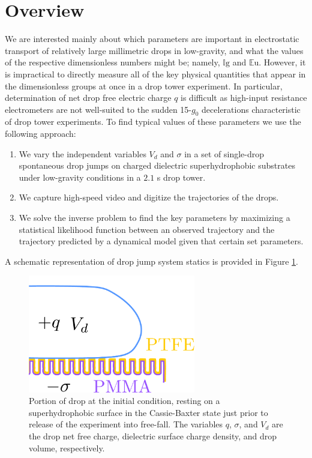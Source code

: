 \documentclass[12pt,a4paper,oneside]{book}
\begin{document}
\section{Overview}
We are interested mainly about which parameters are important in electrostatic transport of relatively large millimetric drops in low-gravity, and what the values of the respective dimensionless numbers might be; namely, $\mathbb{I}\mbox{g}$ and $\mathbb{E}\mbox{u}$. However, it is impractical to directly measure all of the key physical quantities that appear in the dimensionless groups at once in a drop tower experiment. In particular, determination of net drop free electric charge $q$ is difficult as high-input resistance electrometers are not well-suited to the sudden 15-$g_0$ decelerations characteristic of drop tower experiments. To find typical values of these parameters we use the following approach:
\begin{enumerate}
\item We vary the independent variables $V_d$ and $\sigma$ in a set of single-drop spontaneous drop jumps on charged dielectric superhydrophobic substrates under low-gravity conditions in a $2.1$ s drop tower. 
\item We capture high-speed video and digitize the trajectories of the drops. 
\item We solve the inverse problem to find the key parameters by maximizing a statistical likelihood function between an observed trajectory and the trajectory predicted by a dynamical model given that certain set parameters.
\end{enumerate}
A schematic representation of drop jump system statics is provided in Figure \ref{fig:schematic}.
\begin{figure}[ht]
 \centering
 \includegraphics[width=0.65\textwidth]{../figures/schematic.pdf}
 \caption{Portion of drop at the initial condition, resting on a superhydrophobic surface in the Cassie-Baxter state just prior to release of the experiment into free-fall. The variables $q$, $\sigma$, and $V_d$ are the drop net free charge, dielectric surface charge density, and drop volume, respectively.\label{fig:schematic}}
\end{figure}
\end{document}

